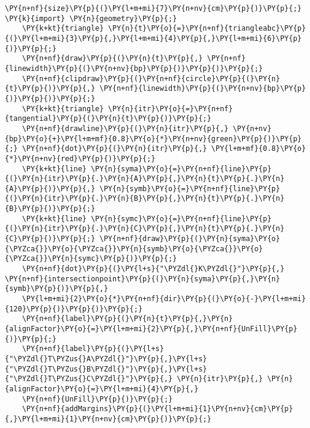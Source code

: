 \begin{Verbatim}[commandchars=\\\{\}]
    \PY{n+nf}{size}\PY{p}{(}\PY{l+m+mi}{7}\PY{n+nv}{cm}\PY{p}{)}\PY{p}{;} \PY{k}{import} \PY{n}{geometry}\PY{p}{;}
    \PY{k+kt}{triangle} \PY{n}{t}\PY{o}{=}\PY{n+nf}{triangleabc}\PY{p}{(}\PY{l+m+mi}{3}\PY{p}{,}\PY{l+m+mi}{4}\PY{p}{,}\PY{l+m+mi}{6}\PY{p}{)}\PY{p}{;}
    \PY{n+nf}{draw}\PY{p}{(}\PY{n}{t}\PY{p}{,} \PY{n+nf}{linewidth}\PY{p}{(}\PY{n+nv}{bp}\PY{p}{)}\PY{p}{)}\PY{p}{;}
    \PY{n+nf}{clipdraw}\PY{p}{(}\PY{n+nf}{circle}\PY{p}{(}\PY{n}{t}\PY{p}{)}\PY{p}{,} \PY{n+nf}{linewidth}\PY{p}{(}\PY{n+nv}{bp}\PY{p}{)}\PY{p}{)}\PY{p}{;}
    \PY{k+kt}{triangle} \PY{n}{itr}\PY{o}{=}\PY{n+nf}{tangential}\PY{p}{(}\PY{n}{t}\PY{p}{)}\PY{p}{;}
    \PY{n+nf}{drawline}\PY{p}{(}\PY{n}{itr}\PY{p}{,} \PY{n+nv}{bp}\PY{o}{+}\PY{l+m+mf}{0.8}\PY{o}{*}\PY{n+nv}{green}\PY{p}{)}\PY{p}{;} \PY{n+nf}{dot}\PY{p}{(}\PY{n}{itr}\PY{p}{,} \PY{l+m+mf}{0.8}\PY{o}{*}\PY{n+nv}{red}\PY{p}{)}\PY{p}{;}
    \PY{k+kt}{line} \PY{n}{syma}\PY{o}{=}\PY{n+nf}{line}\PY{p}{(}\PY{n}{itr}\PY{p}{.}\PY{n}{A}\PY{p}{,}\PY{n}{t}\PY{p}{.}\PY{n}{A}\PY{p}{)}\PY{p}{,} \PY{n}{symb}\PY{o}{=}\PY{n+nf}{line}\PY{p}{(}\PY{n}{itr}\PY{p}{.}\PY{n}{B}\PY{p}{,}\PY{n}{t}\PY{p}{.}\PY{n}{B}\PY{p}{)}\PY{p}{;}
    \PY{k+kt}{line} \PY{n}{symc}\PY{o}{=}\PY{n+nf}{line}\PY{p}{(}\PY{n}{itr}\PY{p}{.}\PY{n}{C}\PY{p}{,}\PY{n}{t}\PY{p}{.}\PY{n}{C}\PY{p}{)}\PY{p}{;} \PY{n+nf}{draw}\PY{p}{(}\PY{n}{syma}\PY{o}{\PYZca{}}\PY{o}{\PYZca{}}\PY{n}{symb}\PY{o}{\PYZca{}}\PY{o}{\PYZca{}}\PY{n}{symc}\PY{p}{)}\PY{p}{;}
    \PY{n+nf}{dot}\PY{p}{(}\PY{l+s}{"\PYZdl{}K\PYZdl{}"}\PY{p}{,} \PY{n+nf}{intersectionpoint}\PY{p}{(}\PY{n}{syma}\PY{p}{,}\PY{n}{symb}\PY{p}{)}\PY{p}{,}
    \PY{l+m+mi}{2}\PY{o}{*}\PY{n+nf}{dir}\PY{p}{(}\PY{o}{-}\PY{l+m+mi}{120}\PY{p}{)}\PY{p}{)}\PY{p}{;}
    \PY{n+nf}{label}\PY{p}{(}\PY{n}{t}\PY{p}{,}\PY{n}{alignFactor}\PY{o}{=}\PY{l+m+mi}{2}\PY{p}{,}\PY{n+nf}{UnFill}\PY{p}{)}\PY{p}{;}
    \PY{n+nf}{label}\PY{p}{(}\PY{l+s}{"\PYZdl{}T\PYZus{}A\PYZdl{}"}\PY{p}{,}\PY{l+s}{"\PYZdl{}T\PYZus{}B\PYZdl{}"}\PY{p}{,}\PY{l+s}{"\PYZdl{}T\PYZus{}C\PYZdl{}"}\PY{p}{,} \PY{n}{itr}\PY{p}{,} \PY{n}{alignFactor}\PY{o}{=}\PY{l+m+mi}{4}\PY{p}{,}
    \PY{n+nf}{UnFill}\PY{p}{)}\PY{p}{;}
    \PY{n+nf}{addMargins}\PY{p}{(}\PY{l+m+mi}{1}\PY{n+nv}{cm}\PY{p}{,}\PY{l+m+mi}{1}\PY{n+nv}{cm}\PY{p}{)}\PY{p}{;}
\end{Verbatim}
